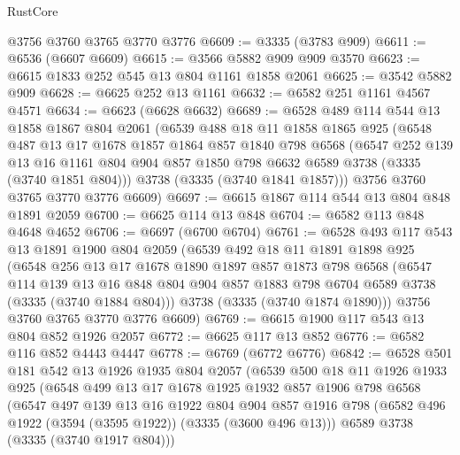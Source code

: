 \begin{lexlean}{RustCore}
\begin{coremodule}
    @3756
    @3760
    @3765
    @3770
    @3776
@6609 := @3335 (@3783 @909)
@6611 := @6536 (@6607 @6609)
@6615 := @3566 @5882 @909 @909 @3570
@6623 := @6615 @1833 @252 @545 @13 @804 @1161 @1858 @2061
@6625 := @3542 @5882 @909
@6628 := @6625 @252 @13 @1161
@6632 := @6582 @251 @1161 @4567 @4571
@6634 := @6623 (@6628 @6632)
@6689 := @6528
    @489
    @114
    @544
    @13
    @1858
    @1867
    @804
    @2061
    (@6539
      @488
      @18
      @11
      @1858
      @1865
      @925
      (@6548
        @487
        @13
        @17
        @1678
        @1857
        @1864
        @857
        @1840
        @798
        @6568
        (@6547
          @252
          @139
          @13
          @16
          @1161
          @804
          @904
          @857
          @1850
          @798
          @6632
          @6589
          @3738
          (@3335 (@3740 @1851 @804)))
        @3738
        (@3335 (@3740 @1841 @1857)))
      @3756
      @3760
      @3765
      @3770
      @3776
      @6609)
@6697 := @6615 @1867 @114 @544 @13 @804 @848 @1891 @2059
@6700 := @6625 @114 @13 @848
@6704 := @6582 @113 @848 @4648 @4652
@6706 := @6697 (@6700 @6704)
@6761 := @6528
    @493
    @117
    @543
    @13
    @1891
    @1900
    @804
    @2059
    (@6539
      @492
      @18
      @11
      @1891
      @1898
      @925
      (@6548
        @256
        @13
        @17
        @1678
        @1890
        @1897
        @857
        @1873
        @798
        @6568
        (@6547
          @114
          @139
          @13
          @16
          @848
          @804
          @904
          @857
          @1883
          @798
          @6704
          @6589
          @3738
          (@3335 (@3740 @1884 @804)))
        @3738
        (@3335 (@3740 @1874 @1890)))
      @3756
      @3760
      @3765
      @3770
      @3776
      @6609)
@6769 := @6615 @1900 @117 @543 @13 @804 @852 @1926 @2057
@6772 := @6625 @117 @13 @852
@6776 := @6582 @116 @852 @4443 @4447
@6778 := @6769 (@6772 @6776)
@6842 := @6528
    @501
    @181
    @542
    @13
    @1926
    @1935
    @804
    @2057
    (@6539
      @500
      @18
      @11
      @1926
      @1933
      @925
      (@6548
        @499
        @13
        @17
        @1678
        @1925
        @1932
        @857
        @1906
        @798
        @6568
        (@6547
          @497
          @139
          @13
          @16
          @1922
          @804
          @904
          @857
          @1916
          @798
          (@6582 @496 @1922 (@3594 (@3595 @1922)) (@3335 (@3600 @496 @13)))
          @6589
          @3738
          (@3335 (@3740 @1917 @804)))

\end{coremodule}
\end{lexlean}
